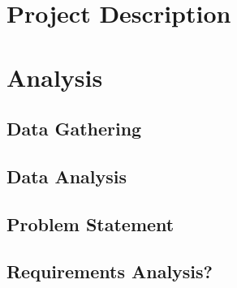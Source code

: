 \part*{Project Description}



\part{Analysis}
% 
% 
% 
% 
% 
% 
% 
% 


\chapter{Data Gathering}\label{cha:DG}







\chapter{Data Analysis}\label{cha:DA}




\chapter{Problem Statement}


\chapter{Requirements Analysis?}


